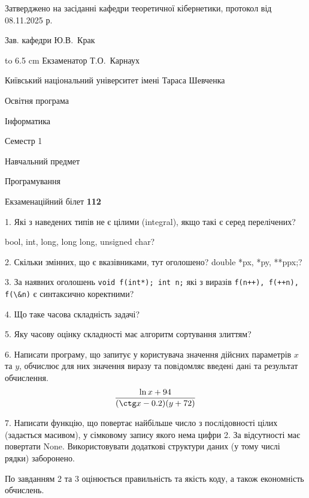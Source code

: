 \documentclass[12pt, ukrainian]{article}
\def\code#1{\Verb!#1!}
\begin{document}
{\smallskip\smallskip \begin {scriptsize} Затверджено на засіданні кафедри теоретичної кібернетики, протокол   від   08.11.2025 р.\par\smallskip\smallskip\smallskip\smallskip
{\parbox {6.5 cm} {Зав. кафедри \dotfill Ю.В.~Крак}}\hspace {0.7cm} {\hbox to 6.5 cm { Екзаменатор \dotfill Т.О.~Карнаух}} \end{scriptsize}}
\vspace{0.9cm}
{{\begin {scriptsize}\par
{ \center  Київський національний університет імені Тараса Шевченка \par}
{\parbox {5 cm}{Освітня програма \hfill}{\parbox {7 cm}{Інформатика\hfill}}\parbox {6 cm}{\hfill Семестр 1}}\par
{\parbox {5 cm} {Навчальний предмет \hfill}\parbox {7 cm}{Програмування \hfill}\parbox {6cm}{\hfill}\par}\vspace{-15pt} \end{scriptsize}}{\center Екзаменаційний білет \No \textbf { 112 }\par}}
{%
1. Які з наведених типів не є цілими (integral), якщо такі є серед перелічених?

bool, int, long, long long, unsigned char?
\par
\vspace{2mm}
2. Скільки змінних, що є вказівниками, тут оголошено?
double *px, *py, **ppx;?
\par
\vspace{2mm}
3. За наявних оголошень \code{void f(int*); int n;} які з виразів \code{f(n++), f(++n), f(\&n)} є синтаксично коректними?
\par
\vspace{2mm}
4. Що таке часова складність задачі?
\par
\vspace{2mm}
5. Яку часову оцінку складності має алгоритм сортування злиттям?
\par
\vspace{2mm}
6. Написати програму, що запитує у користувача значення дійсних параметрів $x$ та $y$, обчислює для них значення виразу та повiдомляє введенi данi та результат обчислення.
$$\frac{\ln x + 94}{(\ctg x - 0.2) (y + 72)}$$ 

\par
7. Написати функцію, що повертає найбільше число з послідовності цілих (задається масивом), у сімковому запису якого нема цифри 2. За відсутності має повертати None. Використовувати додаткові структури даних (у тому числі рядки) заборонено.

По завданням 2 та 3 оцінюється правильність та якість коду, а також економність обчислень.

}
\end{document}
